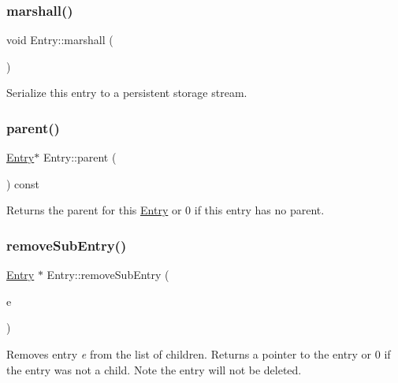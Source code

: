 \subsubsection{\texorpdfstring{marshall()}{marshall()}}
{\footnotesize\ttfamily void Entry\+::marshall (\begin{DoxyParamCaption}\item[{\mbox{\hyperlink{class_storage_intf}{Storage\+Intf}} $\ast$}]{ }\end{DoxyParamCaption})}

Serialize this entry to a persistent storage stream. \mbox{\label{class_entry_ad3ab0ffc3607082ee955b6eeca68dc89}} 
\subsubsection{\texorpdfstring{parent()}{parent()}}
{\footnotesize\ttfamily \mbox{\hyperlink{class_entry}{Entry}}$\ast$ Entry\+::parent (\begin{DoxyParamCaption}{ }\end{DoxyParamCaption}) const\hspace{0.3cm}{\ttfamily [inline]}}

Returns the parent for this \mbox{\hyperlink{class_entry}{Entry}} or 0 if this entry has no parent. \mbox{\label{class_entry_aecaae1b0c184b1ee2dc342ce7d6300f1}} 
\subsubsection{\texorpdfstring{removeSubEntry()}{removeSubEntry()}}
{\footnotesize\ttfamily \mbox{\hyperlink{class_entry}{Entry}} $\ast$ Entry\+::remove\+Sub\+Entry (\begin{DoxyParamCaption}\item[{\mbox{\hyperlink{class_entry}{Entry}} $\ast$}]{e }\end{DoxyParamCaption})}

Removes entry {\itshape e} from the list of children. Returns a pointer to the entry or 0 if the entry was not a child. Note the entry will not be deleted. \mbox{\label{class_entry_ae9367c39f34b043c6e36ddb52a4188e0}} 
